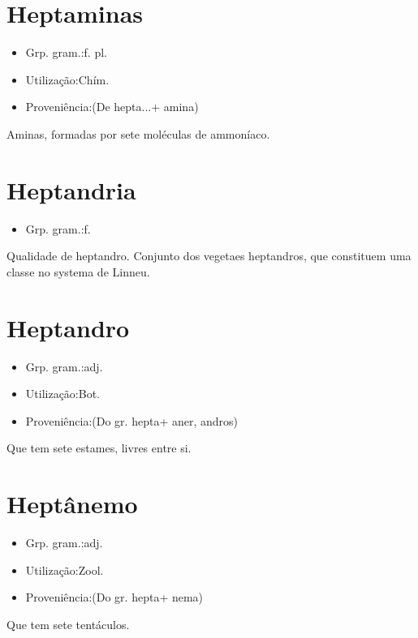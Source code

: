 \documentclass{article}
\begin{document}
\section{Heptaminas}
\begin{itemize}
\item {Grp. gram.:f. pl.}
\end{itemize}
\begin{itemize}
\item {Utilização:Chím.}
\end{itemize}
\begin{itemize}
\item {Proveniência:(De \textunderscore hepta...\textunderscore  + \textunderscore amina\textunderscore )}
\end{itemize}
Aminas, formadas por sete moléculas de ammoníaco.
\section{Heptandria}
\begin{itemize}
\item {Grp. gram.:f.}
\end{itemize}
Qualidade de heptandro.
Conjunto dos vegetaes heptandros, que constituem uma classe no systema de Linneu.
\section{Heptandro}
\begin{itemize}
\item {Grp. gram.:adj.}
\end{itemize}
\begin{itemize}
\item {Utilização:Bot.}
\end{itemize}
\begin{itemize}
\item {Proveniência:(Do gr. \textunderscore hepta\textunderscore  + \textunderscore aner\textunderscore , \textunderscore andros\textunderscore )}
\end{itemize}
Que tem sete estames, livres entre si.
\section{Heptânemo}
\begin{itemize}
\item {Grp. gram.:adj.}
\end{itemize}
\begin{itemize}
\item {Utilização:Zool.}
\end{itemize}
\begin{itemize}
\item {Proveniência:(Do gr. \textunderscore hepta\textunderscore  + \textunderscore nema\textunderscore )}
\end{itemize}
Que tem sete tentáculos.
\end{document}
